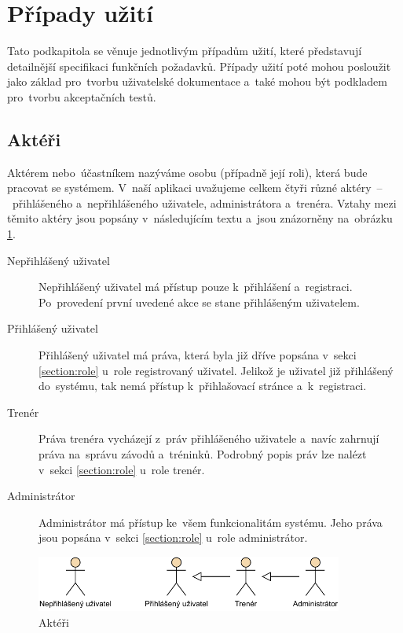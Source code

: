 \section{Případy užití}
Tato podkapitola se věnuje jednotlivým případům užití, které představují detailnější specifikaci funkčních požadavků. Případy užití poté mohou posloužit jako základ pro~tvorbu uživatelské dokumentace a~také mohou být podkladem pro~tvorbu akceptačních testů. \cite{usecases}

\subsection{Aktéři}
Aktérem nebo~účastníkem nazýváme osobu (případně její roli), která bude pracovat se systémem. V~naší aplikaci uvažujeme celkem čtyři různé aktéry~–~přihlášeného a~nepřihlášeného uživatele, administrátora a~trenéra. Vztahy mezi těmito aktéry jsou popsány v~následujícím textu a~jsou znázorněny na~obrázku \ref{figure:actors}.
\begin{description}
	\item[Nepřihlášený uživatel]\hfill\newline
	Nepřihlášený uživatel má přístup pouze k~přihlášení a~registraci. Po~provedení první uvedené akce se stane přihlášeným uživatelem.
	\item[Přihlášený uživatel]\hfill\newline
	Přihlášený uživatel má práva, která byla již dříve popsána v~sekci \ref{section:role} u~role registrovaný uživatel. Jelikož je uživatel již přihlášený do~systému, tak nemá přístup k~přihlašovací stránce a~k~registraci.
	\item[Trenér]\hfill\newline
	Práva trenéra vycházejí z~práv přihlášeného uživatele a~navíc zahrnují práva na~správu závodů a~tréninků. Podrobný popis práv lze nalézt v~sekci \ref{section:role} u~role trenér.
	\item[Administrátor]\hfill\newline
	Administrátor má přístup ke~všem funkcionalitám systému. Jeho práva jsou popsána v~sekci \ref{section:role} u~role administrátor.
\end{description}

\begin{figure}[h]
	\caption{Aktéři}
	\label{figure:actors}
	\centering
	\includegraphics[width=0.9\textwidth]{images/actors.pdf}
\end{figure}


